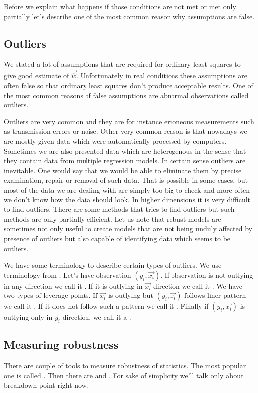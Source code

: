 Before we explain what happens if those conditions are not met or met only partially let's describe one of the most common reason why assumptions are false.

\subsection{Outliers}
We stated a lot of assumptions that are required for ordinary least squares to give 
good estimate of $\vec{\hat{w}}$. Unfortunately in  real conditions these assumptions are often false so that ordinary least squares don't produce acceptable results. One of the most common reasons of false assumptions are abnormal observations called outliers.

Outliers are very common and they are for instance erroneous measurements such as transmission errors or noise. Other very common reason is that nowadays we are mostly given data which were automatically processed by computers. Sometimes we are also presented data which are heterogenous in the sense  that they contain data from multiple regression models. In certain sense outliers are inevitable. One would say that we would be able to eliminate them by precise examination, repair or removal of such data. That is possible in some cases, but most of the data we are dealing with are simply too big to check and more often we don't know how the data should look. In higher dimensions it is very difficult to find outliers. There are some methods that tries to find outliers but such methods are only partially efficient. Let us note that robust models are sometimes not only useful to create models that are not being unduly affected by presence of outliers but also capable of identifying data which seems to be outliers. 

We have some terminology to describe certain types of outliers. We use terminology from \cite{rouss:1990}. Let's have observation $(y_i, \vec{x_i})$. If observation is not outlying in any direction we call it  . If it is outlying in $\vec{x_i}$ direction we call it . We have two types of leverage points. If $\vec{x_i}$ is outlying but $(y_i, \vec{x_i})$ follows liner pattern we call it  . If it does not follow such a pattern we call it . Finally if $(y_i, \vec{x_i})$ is  outlying only in $y_i$  direction, we call it a .

\subsection{Measuring robustness}
There are couple of tools to measure robustness of statistics. The most popular one is called . Then there are  and . For sake of simplicity we'll talk only about breakdown point right now. 

